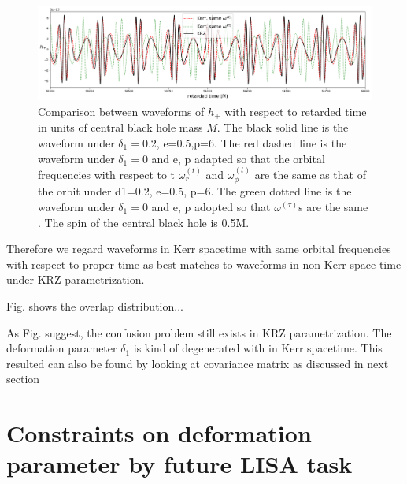 \documentclass{article}
\begin{document}
\begin{figure}[!htb]
	\centering
	\includegraphics[width=16cm]{krz_kerr_wave.png}
	
	\caption{Comparison between waveforms of $h_+$ with respect to retarded time in units of central black hole mass $M$. The black solid line is the waveform under $\delta_1=0.2$, e=0.5,p=6. The red dashed line is the waveform under $\delta_1=0$ and e, p adapted so that the orbital frequencies with respect to t $\omega^{(t)}_r$ and $\omega^{(t)}_\phi$ are the same as that of the orbit under d1=0.2, e=0.5, p=6. The green dotted line is the waveform under $\delta_1 =0$ and e, p adopted so that $\omega^{(\tau)}$s are the same . The spin of the central black hole is 0.5M.}
	\label{kkwave}
\end{figure}	
	
Therefore we regard waveforms in Kerr spacetime with same orbital frequencies with respect to proper time as best matches to waveforms in non-Kerr space time under KRZ parametrization.

Fig. shows the overlap distribution...

As Fig. suggest, the confusion problem still exists in KRZ parametrization. The deformation parameter $\delta_1$ is kind of degenerated with   in Kerr spacetime. This resulted can also be found by looking at covariance matrix as discussed in next section
\section{Constraints on deformation parameter by future LISA task}



\end{document}
